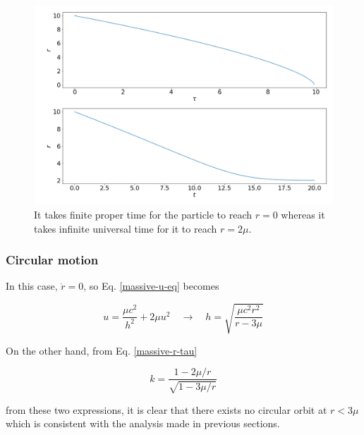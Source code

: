 \documentclass[letterpaper,11pt,onecolumn]{article}
\begin{document}
\begin{figure}[h!]
    \centering
    \includegraphics[width=0.8\linewidth]{Report/Images/2_radial_motion.png}
    \caption{It takes finite proper time for the particle to reach $r=0$ whereas it takes infinite universal time for it to reach $r = 2\mu$.}
    \label{fig:massive-ff}
\end{figure}


\subsubsection{Circular motion}


In this case, $\dot{r} = 0$, so Eq. \ref{massive-u-eq} becomes

\begin{equation}
    u = \frac{\mu c^2}{h^2} + 2 \mu u^2 \quad \longrightarrow \quad h = \sqrt{\frac{\mu c^2 r^2}{r-3 \mu}} 
\end{equation}
 
On the other hand, from Eq. \ref{massive-r-tau}

\begin{equation}
    k = \frac{1-2\mu/r}{\sqrt{1-3\mu/r}}
\end{equation}
 
 from these two expressions, it is clear that there exists no circular orbit at $r<3\mu$ which is consistent with the analysis made in previous sections. 
 
\end{document}
